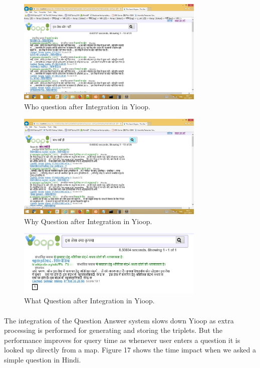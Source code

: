 \begin{figure}[htb]
\centering
\includegraphics[width=0.8\textwidth]{images/who_question.jpg}
\caption{Who question after Integration in Yioop.} 
\label{fig:who_question}
\end{figure}
\break

\begin{figure}[htb]
\centering
\includegraphics[width=0.8\textwidth]{images/why_question.jpg}
\caption{Why Question after Integration in Yioop.} 
\label{fig:why_question}
\end{figure}

\begin{figure}[htb]
\centering
\includegraphics[width=0.8\textwidth]{images/what_question.jpg}
\caption{What Question after Integration in Yioop.} 
\label{fig:what_question}
\end{figure}

\paragraph{}
The integration of the Question Answer system slows down Yioop as extra processing is performed for generating and storing the triplets. But the performance improves for query time as whenever user enters a question it is looked up directly from a map. Figure 17 shows the time impact when we asked a simple question in Hindi.

